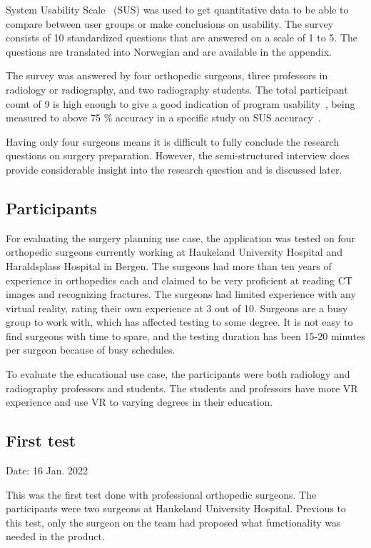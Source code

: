 \documentclass[a4paper]{report}
\begin{document}
System Usability Scale~\cite{system_usability_scale_sus_system_2013} (SUS) was used to get quantitative data to be able to compare between user groups or make conclusions on usability.
The survey consists of 10 standardized questions that are answered on a scale of 1 to 5. The questions are translated into Norwegian and are available in the appendix.

The survey was answered by four orthopedic surgeons, three professors in radiology or radiography, and two radiography students. The total participant count of 9 is high enough to give a good indication of program usability~\cite{experience_why_nodate}, being measured to above 75 \% accuracy in a specific study on SUS accuracy~\cite{tullis_comparison_nodate}.

Having only four surgeons means it is difficult to fully conclude the research questions on surgery preparation. However, the semi-structured interview does provide considerable insight into the research question and is discussed later.


\subsection{Participants}

For evaluating the surgery planning use case, the application was tested on four orthopedic surgeons currently working at Haukeland University Hospital and Haraldsplass Hospital in Bergen.
The surgeons had more than ten years of experience in orthopedics each and claimed to be very proficient at reading CT images and recognizing fractures.
The surgeons had limited experience with any virtual reality, rating their own experience at 3 out of 10.
Surgeons are a busy group to work with, which has affected testing to some degree. It is not easy to find surgeons with time to spare, and the testing duration has been 15-20 minutes per surgeon because of busy schedules.

To evaluate the educational use case, the participants were both radiology and radiography professors and students. The students and professors have more VR experience and use VR to varying degrees in their education.

\subsection{First test}
Date: 16 Jan. 2022

This was the first test done with professional orthopedic surgeons. The participants were two surgeons at Haukeland University Hospital. Previous to this test, only the surgeon on the team had proposed what functionality was needed in the product.
\end{document}
